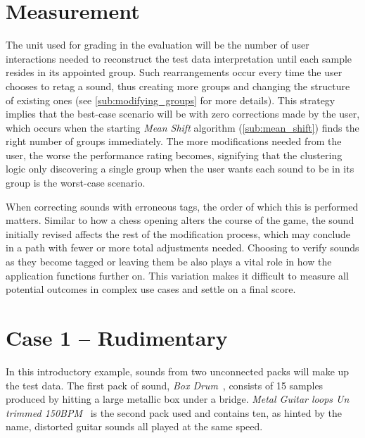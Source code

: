 \section{Measurement}\label{sec:measurement}
The unit used for grading in the evaluation will be the number of user interactions needed to reconstruct the test data interpretation until each sample resides in its appointed group. Such rearrangements occur every time the user chooses to retag a sound, thus creating more groups and changing the structure of existing ones (see \cref{sub:modifying_groups} for more details). This strategy implies that the best-case scenario will be with zero corrections made by the user, which occurs when the starting \emph{Mean Shift} algorithm (\cref{sub:mean_shift}) finds the right number of groups immediately. The more modifications needed from the user, the worse the performance rating becomes, signifying that the clustering logic only discovering a single group when the user wants each sound to be in its group is the worst-case scenario.

When correcting sounds with erroneous tags, the order of which this is performed matters. Similar to how a chess opening alters the course of the game, the sound initially revised affects the rest of the modification process, which may conclude in a path with fewer or more total adjustments needed. Choosing to verify sounds as they become tagged or leaving them be also plays a vital role in how the application functions further on. This variation makes it difficult to measure all potential outcomes in complex use cases and settle on a final score.

\newpage\section{Case 1 – Rudimentary}
In this introductory example, sounds from two unconnected packs will make up the test data. The first pack of sound, \emph{Box Drum}~\cite{pack:1904}, consists of 15 samples produced by hitting a large metallic box under a bridge. \emph{Metal Guitar loops Un trimmed 150BPM}~\cite{pack:19793} is the second pack used and contains ten, as hinted by the name, distorted guitar sounds all played at the same speed.

